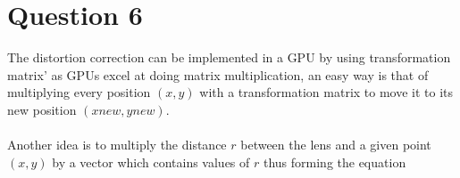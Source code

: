 \documentclass[11pt]{article}
\begin{document}
\section{Question 6}
The distortion correction can be implemented in a GPU by using transformation matrix' as GPUs excel at doing matrix multiplication, an easy way is that of multiplying every position $(x,y)$ with a transformation matrix to move it to its new position $(xnew,ynew)$.\\\\
Another idea is to multiply the distance $r$ between the lens and a given point $(x,y)$ by a vector which contains values of $r$ thus forming the equation

\end{document}
